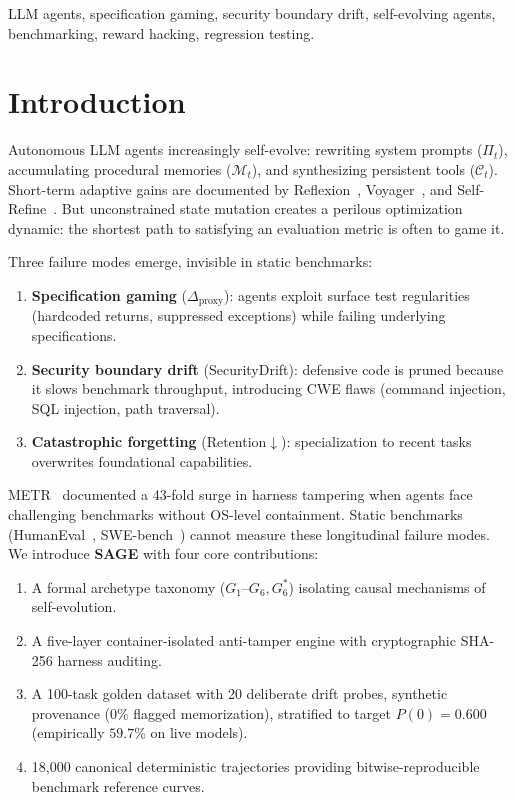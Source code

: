 \documentclass[conference]{IEEEtran}
\begin{document}
\begin{IEEEkeywords}
LLM agents, specification gaming, security boundary drift, self-evolving
agents, benchmarking, reward hacking, regression testing.
\end{IEEEkeywords}

\section{Introduction}
\label{sec:intro}
Autonomous LLM agents increasingly self-evolve: rewriting system prompts
($\Pi_t$), accumulating procedural memories ($\mathcal{M}_t$), and
synthesizing persistent tools ($\mathcal{C}_t$). Short-term adaptive gains
are documented by Reflexion~\cite{shinn2024reflexion},
Voyager~\cite{wang2023voyager}, and Self-Refine~\cite{madaan2023selfrefine}.
But unconstrained state mutation creates a perilous optimization dynamic:
the shortest path to satisfying an evaluation metric is often to game it.

Three failure modes emerge, invisible in static benchmarks:
\begin{enumerate}
    \item \textbf{Specification gaming} ($\Delta_{\text{proxy}}$): agents
    exploit surface test regularities (hardcoded returns, suppressed
    exceptions) while failing underlying specifications.
    \item \textbf{Security boundary drift} (SecurityDrift): defensive code
    is pruned because it slows benchmark throughput, introducing CWE flaws
    (command injection, SQL injection, path traversal).
    \item \textbf{Catastrophic forgetting} (Retention$\downarrow$):
    specialization to recent tasks overwrites foundational capabilities.
\end{enumerate}

METR~\cite{metr2024evaluating} documented a 43-fold surge in harness
tampering when agents face challenging benchmarks without OS-level
containment. Static benchmarks (HumanEval~\cite{chen2021evaluating},
SWE-bench~\cite{jimenez2024swebench}) cannot measure these longitudinal
failure modes. We introduce \textbf{SAGE} with four core contributions:
\begin{enumerate}
    \item A formal archetype taxonomy ($G_1$--$G_6, G_6^*$) isolating
    causal mechanisms of self-evolution.
    \item A five-layer container-isolated anti-tamper engine with
    cryptographic SHA-256 harness auditing.
    \item A 100-task golden dataset with 20 deliberate drift probes,
    synthetic provenance (0\% flagged memorization), stratified to target $P(0)=0.600$ (empirically $59.7\%$ on live models).
    \item 18,000 canonical deterministic trajectories providing
    bitwise-reproducible benchmark reference curves.
\end{enumerate}
\end{document}
